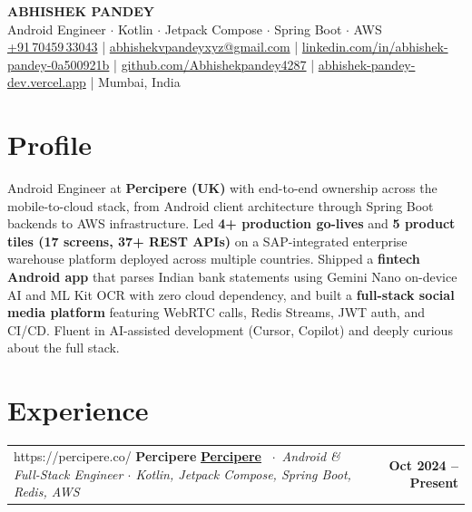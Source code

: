\documentclass[10pt, letterpaper]{article}
\makeatletter
\newcommand{\role}[4]{%
  \noindent
  \begin{tabularx}{\linewidth}{@{}X r@{}}
    \ifx\relax#2\relax
      {\small\bfseries\color{NavyTx}#1}
    \else
      {\small\bfseries\href{#2}{\color{BlueAc}#1}}%
    \fi
    {\footnotesize\color{MetaTx}\ $\cdot$\ \textit{#3}}
    &
    {\footnotesize\bfseries\color{NavyTx}#4}
  \end{tabularx}\vspace{0pt}%
}
\newcommand{\bn}[1]{{\bfseries\color{NavyTx}#1}}
\makeatother
\begin{document}
\begin{center}
  {\fontsize{20}{24}\selectfont\bfseries\color{NavyTx} ABHISHEK PANDEY}\\[2pt]
  {\small\color{BodyTx}
    Android Engineer $\cdot$ Kotlin $\cdot$ Jetpack Compose $\cdot$ Spring Boot $\cdot$ AWS}\\[3pt]
  {\footnotesize\color{BodyTx}
    \href{tel:+917045933043}{+91\,70459\,33043}
    \enspace|\enspace
    \href{mailto:abhishekvpandeyxyz@gmail.com}{abhishekvpandeyxyz@gmail.com}
    \enspace|\enspace
    \href{https://www.linkedin.com/in/abhishek-pandey-0a500921b}{linkedin.com/in/abhishek-pandey-0a500921b}
    \enspace|\enspace
    \href{https://github.com/Abhishekpandey4287}{github.com/Abhishekpandey4287}
    \enspace|\enspace
    \href{https://abhishek-pandey-dev.vercel.app/}{abhishek-pandey-dev.vercel.app}
    \enspace|\enspace
    Mumbai, India}
\end{center}

\vspace{-6pt}

\section{Profile}

{\small\color{BodyTx}
Android Engineer at \bn{Percipere (UK)} with end-to-end ownership across the mobile-to-cloud stack, from
Android client architecture through Spring Boot backends to AWS infrastructure. Led \bn{4+ production go-lives}
and \bn{5 product tiles (17 screens, 37+ REST APIs)} on a SAP-integrated enterprise warehouse platform
deployed across multiple countries. Shipped a \bn{fintech Android app} that parses Indian bank statements
using Gemini Nano on-device AI and ML Kit OCR with zero cloud dependency, and built a \bn{full-stack social
media platform} featuring WebRTC calls, Redis Streams, JWT auth, and CI/CD. Fluent in AI-assisted development
(Cursor, Copilot) and deeply curious about the full stack.
}

\section{Experience}

\role{Percipere}{https://percipere.co/}%
     {Android \& Full-Stack Engineer $\cdot$ Kotlin, Jetpack Compose, Spring Boot, Redis, AWS}%
     {Oct 2024 – Present}
\end{document}
